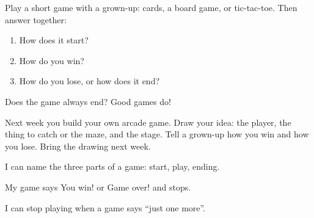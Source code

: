 
\begin{playathome}
Play a short game with a grown-up: cards, a board game, or tic-tac-toe. Then answer together:
\begin{enumerate}[leftmargin=1.4em,itemsep=2pt]
  \item How does it start?
  \item How do you win?
  \item How do you lose, or how does it end?
\end{enumerate}
Does the game always end? Good games do!
\end{playathome}

\begin{playathome}
Next week you build your own arcade game. Draw your idea: the player, the thing to catch or the maze, and the stage. Tell a grown-up how you win and how you lose. Bring the drawing next week.
\answerspace{3cm}
\end{playathome}

\begin{selfcheck}
  \item I can name the three parts of a game: start, play, ending.
  \item My game says You win! or Game over! and stops.
  \item I can stop playing when a game says \enquote{just one more}.
\end{selfcheck}
